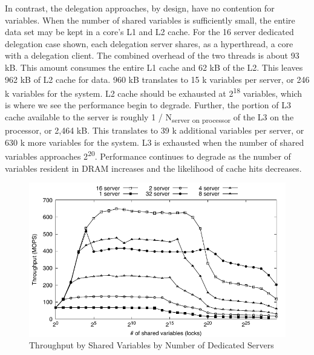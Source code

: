 \documentclass{uicthesi}
\begin{document}
In contrast, the delegation approaches, by design, have no contention for variables. When the number of shared variables is sufficiently small, the entire data set may be kept in a core's L1 and L2 cache. For the 16 server dedicated delegation case shown, each delegation server shares, as a hyperthread, a core with a delegation client. The combined overhead of the two threads is about 93 kB. This amount consumes the entire L1 cache and 62 kB of the L2. This leaves 962 kB of L2 cache for data. 960 kB translates to 15 k variables per server, or 246 k variables for the system. L2 cache should be exhausted at 2\textsuperscript{18} variables, which is where we see the performance begin to degrade. Further, the portion of L3 cache available to the server is roughly 1 / N\textsubscript{server on processor} of the L3 on the processor, or 2,464 kB. This translates to 39 k additional variables per server, or 630 k more variables for the system. L3 is exhausted when the number of shared variables approaches 2\textsuperscript{20}. Performance continues to degrade as the number of variables resident in DRAM increases and the likelihood of cache hits decreases. 


\begin{figure}[ht!]
\centering
\includegraphics[width=0.9\columnwidth]{FIG/fetch_add_dedicated_vary_server.pdf}
\caption{Throughput by Shared Variables by Number of Dedicated Servers}
\label{fig:vary_server}
\end{figure}
\end{document}
